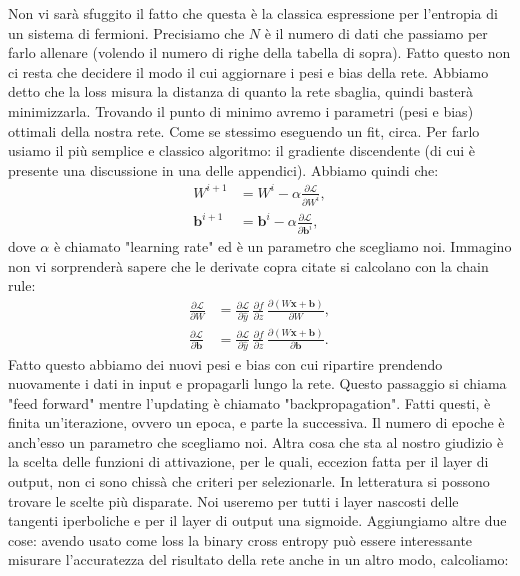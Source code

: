 \documentclass[10pt,a4paper]{article}
\begin{document}
Non vi sarà sfuggito il fatto che questa è la classica espressione per l'entropia di un sistema di fermioni. Precisiamo che $N$ è il numero di dati che passiamo per farlo allenare (volendo il numero di righe della tabella di sopra).
Fatto questo non ci resta che decidere il modo il cui aggiornare i pesi e bias della rete. Abbiamo detto che la loss misura la distanza di quanto la rete sbaglia, quindi basterà minimizzarla. Trovando il punto di minimo avremo i parametri (pesi e bias) ottimali della nostra rete. Come se stessimo eseguendo un fit, circa. Per farlo usiamo il più semplice e classico algoritmo: il gradiente discendente (di cui è presente una discussione in una delle appendici). Abbiamo quindi che:
\begin{align}
W^{i+1} &= W^i - \alpha \frac{\partial \mathcal{L}}{\partial W^i} , \\
\textbf{b}^{i+1} &= \textbf{b}^{i} - \alpha \frac{\partial \mathcal{L}}{\partial \textbf{b}^i},
\end{align}
dove $\alpha$ è chiamato "learning rate" ed è un parametro che scegliamo noi. Immagino non vi sorprenderà sapere che le derivate copra citate si calcolano con la chain rule:
\begin{align}
\frac{\partial \mathcal{L}}{\partial W} &= \frac{\partial \mathcal{L}}{\partial \hat{y}} \, \frac{\partial f}{\partial z} \, \frac{\partial (W \textbf{x} + \textbf{b})}{\partial W}, \\
\frac{\partial \mathcal{L}}{\partial \textbf{b}} &= \frac{\partial \mathcal{L}}{\partial \hat{y}} \, \frac{\partial f}{\partial z} \, \frac{\partial (W \textbf{x} + \textbf{b})}{\partial \textbf{b}}.
\end{align}
Fatto questo abbiamo dei nuovi pesi e bias con cui ripartire prendendo nuovamente i dati in input e propagarli lungo la rete. Questo passaggio si chiama "feed forward" mentre l'updating è chiamato "backpropagation". Fatti questi, è finita un'iterazione, ovvero un epoca, e parte la successiva. Il numero di epoche è anch'esso un parametro che scegliamo noi. Altra cosa che sta al nostro giudizio è la scelta delle funzioni di attivazione, per le quali, eccezion fatta per il layer di output, non ci sono chissà che criteri per selezionarle. In letteratura si possono trovare le scelte più disparate. Noi useremo per tutti i layer nascosti delle tangenti iperboliche e per il layer di output una sigmoide.
Aggiungiamo altre due cose: avendo usato come loss la binary cross entropy può essere interessante misurare l'accuratezza del risultato della rete anche in un altro modo, calcoliamo:
\end{document}
